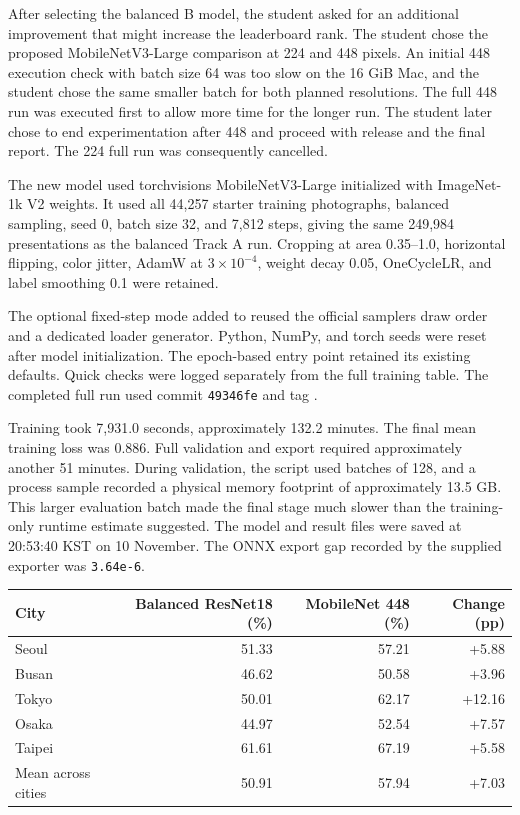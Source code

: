 \documentclass[11pt]{article}
\begin{document}
After selecting the balanced B model, the student asked for an additional
improvement that might increase the leaderboard rank. The student chose
the proposed MobileNetV3-Large comparison at 224 and 448 pixels. An initial
448 execution check with batch size 64 was too slow on the 16 GiB Mac,
and the student chose the same smaller batch for both planned resolutions.
The full 448 run was executed first to allow more time for the longer run.
The student later chose to end experimentation after 448 and proceed with
release and the final report. The 224 full run was consequently cancelled.

The new model used torchvision\textquotesingle{}s MobileNetV3-Large initialized with
ImageNet-1k V2 weights. It used all 44,257 starter training photographs,
balanced sampling, seed 0, batch size 32, and 7,812 steps, giving the same
249,984 presentations as the balanced Track A run. Cropping at area
0.35--1.0, horizontal flipping, color jitter, AdamW at $3\times10^{-4}$,
weight decay 0.05, OneCycleLR, and label smoothing 0.1 were retained.

The optional fixed-step mode added to  reused the
official sampler\textquotesingle{}s draw order and a dedicated loader generator.
Python, NumPy, and torch seeds were reset after model initialization.
The epoch-based entry point retained its existing defaults. Quick checks
were logged separately from the full training table. The completed full
run used commit \texttt{49346fe} and tag .

Training took 7,931.0 seconds, approximately 132.2 minutes. The final mean
training loss was 0.886. Full validation and export required approximately
another 51 minutes. During validation, the script used batches of 128,
and a process sample recorded a physical memory footprint of approximately
13.5 GB. This larger evaluation batch made the final stage much slower
than the training-only runtime estimate suggested. The model and result
files were saved at 20:53:40 KST on 10 November. The ONNX export gap
recorded by the supplied exporter was \texttt{3.64e-6}.

\begin{center}\small
\begin{tabular}{lrrr}
\toprule
City & Balanced ResNet18 (\%) & MobileNet 448 (\%) & Change (pp) \\
\midrule
Seoul & 51.33 & 57.21 & +5.88 \\
Busan & 46.62 & 50.58 & +3.96 \\
Tokyo & 50.01 & 62.17 & +12.16 \\
Osaka & 44.97 & 52.54 & +7.57 \\
Taipei & 61.61 & 67.19 & +5.58 \\
\midrule
Mean across cities & 50.91 & 57.94 & +7.03 \\
\bottomrule
\end{tabular}
\end{center}
\end{document}
